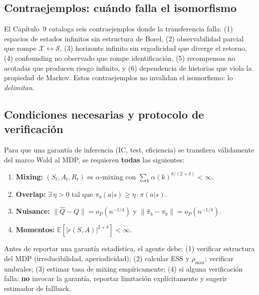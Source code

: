 \documentclass[11pt,a4paper]{article}
\theoremstyle{mitheorem}
\theoremstyle{mitdef}
\newcommand{\SampleSpace}{\mathcal{X}}
\newcommand{\StateSpace}{\mathcal{S}}
\newcommand{\isoto}{\leftrightarrow}
\newcommand{\E}{\mathbb{E}}
\begin{document}
\subsection{Contraejemplos: cuándo falla el isomorfismo}

El Capítulo~9 cataloga seis contraejemplos donde la transferencia falla:
(1) espacios de estados infinitos sin estructura de Borel, (2) observabilidad
parcial que rompe $\SampleSpace\isoto\StateSpace$, (3) horizonte infinito sin
ergodicidad que diverge el retorno, (4) confounding no observado que rompe
identificación, (5) recompensas no acotadas que producen riesgo infinito, y
(6) dependencia de historias que viola la propiedad de Markov. Estos
contraejemplos no invalidan el isomorfismo: lo \emph{delimitan}.

\subsection{Condiciones necesarias y protocolo de verificación}

\begin{tcolorbox}[mitthmstyle, title={Teorema 9.13 — Condiciones Necesarias para Transferencia}]
Para que una garantía de inferencia (IC, test, eficiencia) se transfiera
válidamente del marco Wald al MDP, se requieren \textbf{todas} las siguientes:
\begin{enumerate}
  \item \textbf{Mixing:} $(S_t,A_t,R_t)$ es $\alpha$-mixing con
        $\sum_k \alpha(k)^{\delta/(2+\delta)}<\infty$.
  \item \textbf{Overlap:} $\exists\,\eta>0$ tal que $\pi_b(a|s)\geq \eta\cdot\pi(a|s)$.
  \item \textbf{Nuisance:} $\|\hat Q-Q\|=o_P(n^{-1/4})$ y $\|\hat\pi_b-\pi_b\|=o_P(n^{-1/4})$.
  \item \textbf{Momentos:} $\E[|r(S,A)|^{2+\delta}]<\infty$.
\end{enumerate}
\end{tcolorbox}

\begin{tcolorbox}[mitdefstyle, title={Proposición 9.14 — Protocolo de Verificación}]
Antes de reportar una garantía estadística, el agente debe:
(1) verificar estructura del MDP (irreducibilidad, aperiodicidad);
(2) calcular ESS y $\rho_{\max}$; verificar umbrales;
(3) estimar tasa de mixing empíricamente;
(4) si alguna verificación falla: \textbf{no} invocar la garantía, reportar
    limitación explícitamente y sugerir estimador de fallback.
\end{tcolorbox}
\end{document}
